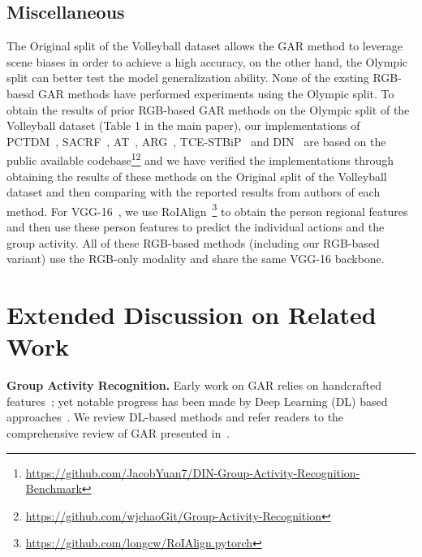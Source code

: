 \documentclass[runningheads]{llncs}
\begin{document}
\subsection{Miscellaneous}


The Original split of the Volleyball dataset allows the GAR method to leverage scene biases in order to achieve a high accuracy, on the other hand, the Olympic split can better test the model generalization ability. None of the exsting RGB-baesd GAR methods have performed experiments using the Olympic split. 
To obtain the results of prior RGB-based GAR methods on the Olympic split of the Volleyball dataset (Table 1 in the main paper), our implementations of 
PCTDM~\cite{PCTDM}, SACRF~\cite{pramono2020empowering}, AT~\cite{actor-transformer}, ARG~\cite{arg}, TCE-STBiP~\cite{yuan2021learning}  and  DIN~\cite{yuan2021spatio} are based on the public available codebase\footnote{\url{https://github.com/JacobYuan7/DIN-Group-Activity-Recognition-Benchmark}}\footnote{\url{https://github.com/wjchaoGit/Group-Activity-Recognition}} and we have verified the implementations through obtaining the results of these methods on the Original split of the Volleyball dataset and then comparing with the reported results from authors of each method. For VGG-16~\cite{simonyan2014very}, we use RoIAlign~\cite{he2017mask}\footnote{\url{https://github.com/longcw/RoIAlign.pytorch}} to obtain the person regional features and then use these person features to predict the individual actions and the group activity. 
All of these RGB-based methods (including our \ours RGB-based variant) use the RGB-only modality and share the same VGG-16 backbone. 
 
  
\renewcommand{\thesection}{G}
\section{Extended Discussion on Related Work}
\label{appendix_sec:related}
  

\noindent \textbf{Group Activity Recognition.}
Early work on GAR relies on handcrafted features~\cite{choi2009they,lan2011discriminative,hajimirsadeghi2015visual,cheng2010group,choi2011learning,choi2012unified,nabi2013temporal}; yet notable progress 
has been made
by Deep Learning (DL) based approaches~\cite{ibrahim2016hierarchical,deng2016structure}. 
We review DL-based methods and refer readers to the comprehensive review of GAR presented in~\cite{wu2021comprehensive}.
\end{document}
